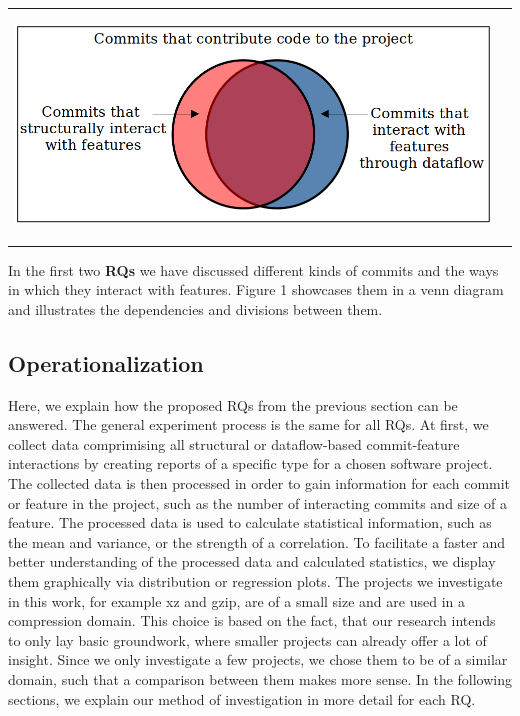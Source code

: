 \begin{center}
\begin{tabular}{cc}
\includegraphics[height=6cm]{gfx/Commits-of-a-Software-Project.png}
\end{tabular}
\end{center}

\textsf{In the first two \textbf{RQs} we have discussed different kinds of commits and the ways in which they interact with features. 
Figure 1 showcases them in a venn diagram and illustrates the dependencies and divisions between them.} 

\subsection*{Operationalization}\label{sec:operationalization}

Here, we explain how the proposed RQs from the previous section can be answered.
The general experiment process is the same for all RQs.
At first, we collect data comprimising all structural or dataflow-based commit-feature interactions by creating reports of a specific type for a chosen software project.
The collected data is then processed in order to gain information for each commit or feature in the project, such as the number of interacting commits and size of a feature.
The processed data is used to calculate statistical information, such as the mean and variance, or the strength of a correlation.
To facilitate a faster and better understanding of the processed data and calculated statistics, we display them graphically via distribution or regression plots.
The projects we investigate in this work, for example xz and gzip, are of a small size and are used in a compression domain.
This choice is based on the fact, that our research intends to only lay basic groundwork, where smaller projects can already offer a lot of insight.
Since we only investigate a few projects, we chose them to be of a similar domain, such that a comparison between them makes more sense.
In the following sections, we explain our method of investigation in more detail for each RQ.

